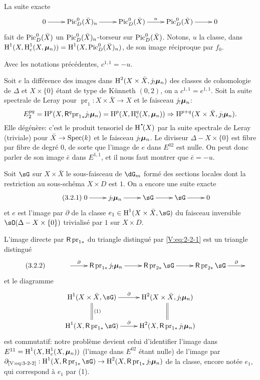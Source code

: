 La suite exacte 
\[\xymatrix{
  0 \ar[r] 
    & \pic_D^0(\bar X)_n \ar[r] 
    & \pic_D^0(\bar X) \ar[r]^n 
    & \pic_D^0(\bar X) \ar[r] 
    & 0 
}\]
fait de $\operatorname{Pic}_D^0(\bar X)$ un $\operatorname{Pic}_D^0(\bar X)_n$-torseur sur 
$\operatorname{Pic}_D^0(\bar X)$. Notons, $u$ la classe, dans 
$\operatorname{H}^1(X,\operatorname{H}_c^1(X,{\bm\mu}_n))=\operatorname{H}^1(X,\operatorname{Pic}_D^0(\bar X)_n)$, de son image 
réciproque par $f_0$. 





\begin{proposition_}\label{V:3-2}
Avec les notations précédentes, $c^{1,1}=-u$.
\end{proposition_}

Soit $e$ la différence des images dans $\operatorname{H}^2(X\times \bar X,j_!{\bm\mu}_n)$ des 
classes de cohomologie de $\Delta$ et $X\times\{0\}$ étant de type de 
K\"unneth $(0,2)$, on a $c^{1,1}=e^{1,1}$. Soit la suite spectrale de Leray 
pour $\operatorname{pr}_1:X\times \bar X\to X$ et le faisceau $j_!{\bm\mu}_n$: 
\[
  E_2^{pq} = \operatorname{H}^p(X,\mathsf{R}^q {\operatorname{pr}_1}_\ast j_!{\bm\mu}_n) = \operatorname{H}^p(X,\operatorname{H}_c^q(X,{\bm\mu}_n)) \Rightarrow \operatorname{H}^{p+q}(X\times \bar X,j_!{\bm\mu}_n) \text{.}
\]
Elle dégénère: c'est le produit tensoriel de $\h^\bullet(X)$ par la 
suite spectrale de Leray (triviale) pour $\bar X\to \operatorname{Spec}(k)$ et le faisceau 
$j_!{\bm\mu}_n$. Le diviseur $\Delta-X\times\{0\}$ est fibre par fibre de degré 
$0$, de sorte que l'image de $e$ dans $E^{02}$ est nulle. On peut donc parler 
de son image $\bar e$ dans $E^{1,1}$, et il nous faut montrer que 
$\bar e = -u$. 

Soit $\sG$ sur $X\times\bar X$ le sous-faisceau de $\dG_m$ formé des sections 
locales dont la restriction au sous-schéma $X\times D$ est $1$. On a encore 
une suite exacte 
\begin{equation*}\tag{3.2.1}\label{V:eq:3-2-1}
\xymatrix{
  0 \ar[r] 
    & j_!\dmu_n \ar[r] 
    & \sG \ar[r] 
    & \sG \ar[r] 
    & 0 
}
\end{equation*}
et $e$ est l'image par $\partial$ de la classe $e_1\in \h^1(X\times\bar X,\sG)$ 
du faisceau inversible $\sO(\Delta-X\times\{0\})$ trivialisé par $1$ sur 
$X\times D$. 

L'image directe par $\mathsf{R}\operatorname{pr}_{1\ast}$ du triangle distingué par 
\eqref{V:eq:2-2-1} est un triangle distingué 
\begin{equation*}\tag{3.2.2}\label{V:eq:3-2-2}
\xymatrix{
  & \ar[r]^-\partial 
    & \R \operatorname{pr}_{1\ast} j_!\dmu_n \ar[r] 
    & \R \operatorname{pr}_{2\ast}\sG \ar[r] 
    & \R \operatorname{pr}_{2\ast}\sG \ar[r]^-\partial 
    & 
}
\end{equation*}
et le diagramme 
\[\xymatrix{
  \h^1(X\times \bar X,\sG) \ar[r]^-\partial \ar@{=}[d]^-{(1)} 
    & \h^2(X\times \bar X,j_!\dmu_n) \ar@{=}[d] \\
  \h^1(X,\R\operatorname{pr}_{1\ast} \sG) \ar[r]^-\partial 
    & \h^2(X,\R\operatorname{pr}_{1\ast} j_!\dmu_n) 
}\]
est commutatif: notre problème devient celui d'identifier l'image dans 
$E^{11}=\operatorname{H}^1(X,\operatorname{H}_c^1(X,{\bm\mu}_n))$ (l'image dans $E^{02}$ étant nulle) de 
l'image par 
$\partial_{\text{\eqref{V:eq:3-2-2}}}:\h^1(X,\R\operatorname{pr}_{1\ast}\sG) \to \h^2(X,\R\operatorname{pr}_{1\ast} j_!\dmu_n)$ 
de la classe, encore notée $e_1$, qui correspond à $e_1$ par 
(1). 

